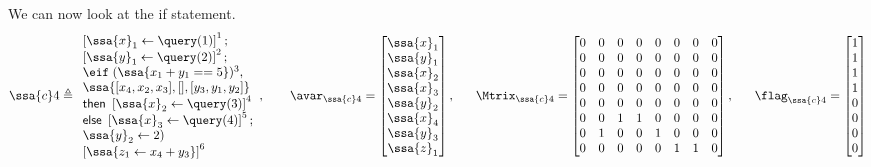 %
We can now look at the if statement.
\[ 
%
 \ssa{c}4 \triangleq
\begin{array}{l}
   	\left[ \ssa{x}_1 \leftarrow \query(1) \right]^1; 
   	\\
   	\left[\ssa{y}_1 \leftarrow \query(2) \right]^2 ; 
   	\\
    \eif \;( \ssa{ x_1 + y_1 == 5} )^3,  \\
    \ssa{[ x_4,x_2,x_3 ],[] ,[y_3,y_1,y_2 ]} 
    \\
    \mathsf{then} ~ \left[ 
    \ssa{x}_2 \leftarrow \query(3) \right]^4 
    \\
    \mathsf{else} ~ \left[ 
    \ssa{x}_3 \leftarrow \query(4) \right]^5 ; 
    \\
    \ssa{y}_2 \leftarrow 2 ) \\
   \left[ \ssa{ z_1 \leftarrow x_4 +y_3 }\right]^6
\end{array},
~~~~~~
\avar_{\ssa{c}4} =  \left[ \begin{matrix}
\ssa{x}_1 \\
\ssa{y}_1 \\
\ssa{x}_2 \\
\ssa{x}_3 \\
\ssa{y}_2 \\
\ssa{x}_4 \\
\ssa{y}_3 \\
\ssa{z}_1 \\
\end{matrix} \right], 
~~~~~ 
\Mtrix_{\ssa{c}4} =  \left[ \begin{matrix}
 0 & 0 & 0 & 0 & 0 & 0 & 0 & 0 \\
 0 & 0 & 0 & 0 & 0 & 0 & 0 & 0 \\
 0 & 0 & 0 & 0 & 0 & 0 & 0 & 0 \\
 0 & 0 & 0 & 0 & 0 & 0 & 0 & 0 \\
 0 & 0 & 0 & 0 & 0 & 0 & 0 & 0 \\
 0 & 0 & 1 & 1 & 0 & 0 & 0 & 0 \\
 0 & 1 & 0 & 0 & 1 & 0 & 0 & 0 \\
 0 & 0 & 0 & 0 & 0 & 1 & 1 & 0 \\
\end{matrix} \right], 
~~~~~ 
\flag_{\ssa{c}4} = \left [ \begin{matrix}
 1 \\
 1 \\
 1 \\
 1 \\
 0 \\
 0 \\
 0 \\
 0 \\
\end{matrix} \right ]
\]
%
%
%
%
